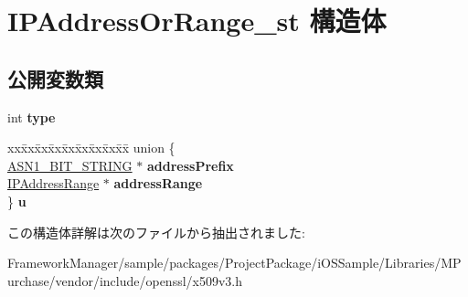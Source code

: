 \hypertarget{struct_i_p_address_or_range__st}{}\section{I\+P\+Address\+Or\+Range\+\_\+st 構造体}
\label{struct_i_p_address_or_range__st}
\subsection*{公開変数類}
\begin{DoxyCompactItemize}
\item 
\hypertarget{struct_i_p_address_or_range__st_aa9221b14bda47976f0591fe65a3d90aa}{}int {\bfseries type}\label{struct_i_p_address_or_range__st_aa9221b14bda47976f0591fe65a3d90aa}

\item 
\hypertarget{struct_i_p_address_or_range__st_ae2407e6924b957b516f876b92bb76748}{}\begin{tabbing}
xx\=xx\=xx\=xx\=xx\=xx\=xx\=xx\=xx\=\kill
union \{\\
\>\hyperlink{structasn1__string__st}{ASN1\_BIT\_STRING} $\ast$ {\bfseries addressPrefix}\\
\>\hyperlink{struct_i_p_address_range__st}{IPAddressRange} $\ast$ {\bfseries addressRange}\\
\} {\bfseries u}\label{struct_i_p_address_or_range__st_ae2407e6924b957b516f876b92bb76748}
\\

\end{tabbing}\end{DoxyCompactItemize}


この構造体詳解は次のファイルから抽出されました\+:\begin{DoxyCompactItemize}
\item 
Framework\+Manager/sample/packages/\+Project\+Package/i\+O\+S\+Sample/\+Libraries/\+M\+Purchase/vendor/include/openssl/x509v3.\+h\end{DoxyCompactItemize}
